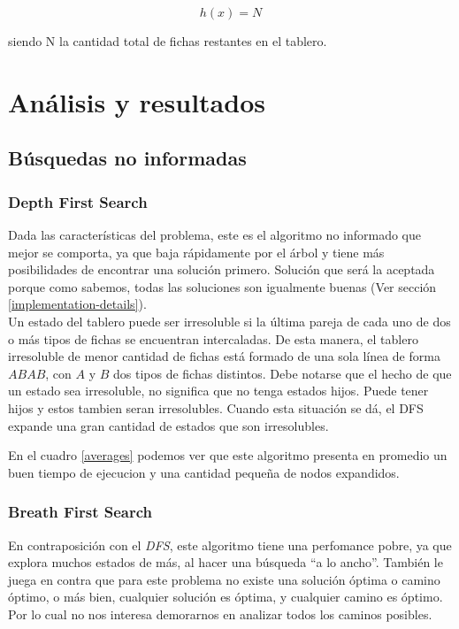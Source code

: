 \documentclass[a4paper,10pt]{article}
\begin{document}
    \[ h(x) = N \] 

    siendo N la cantidad total de fichas restantes en el tablero.

\section{Análisis y resultados}

\subsection{Búsquedas no informadas}

    \subsubsection{Depth First Search}
    \label{sec:dfs}
    Dada las características del problema, este es el algoritmo no informado que mejor se comporta, ya que baja rápidamente por el árbol y tiene más posibilidades de encontrar una solución primero.
    Solución que será la aceptada porque como sabemos, todas las soluciones son igualmente buenas (Ver sección \ref{implementation-details}).\\

    Un estado del tablero puede ser irresoluble si la última pareja de cada uno de dos o más tipos de fichas se encuentran intercaladas.
    De esta manera, el tablero irresoluble de menor cantidad de fichas está formado de una sola línea de forma $ABAB$, con $A$ y $B$ dos tipos de fichas distintos.
    Debe notarse que el hecho de que un estado sea irresoluble, no significa que no tenga estados hijos.
    Puede tener hijos y estos tambien seran irresolubles.
    Cuando esta situación se dá, el DFS expande una gran cantidad de estados que son irresolubles.

    En el cuadro \ref{averages} podemos ver que este algoritmo presenta en promedio un buen tiempo de ejecucion y una cantidad pequeña de nodos expandidos.
    
    \subsubsection{Breath First Search}
    En contraposición con el \textit{DFS}, este algoritmo tiene una perfomance pobre, ya que explora muchos estados de más, al hacer una búsqueda ``a lo ancho''.
    También le juega en contra que para este problema no existe una solución óptima o camino óptimo, o más bien, cualquier solución es óptima, y cualquier camino es óptimo. 
    Por lo cual no nos interesa demorarnos en analizar todos los caminos posibles.
\end{document}
